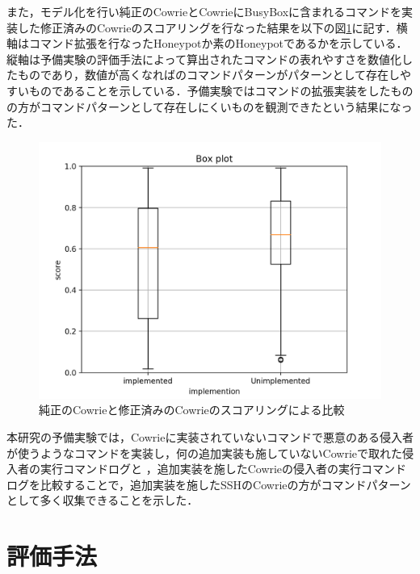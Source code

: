 
また，モデル化を行い純正のCowrieとCowrieにBusyBoxに含まれるコマンドを実装した修正済みのCowrieのスコアリングを行なった結果を以下の図\ref{fig:cowriecompare}に記す．横軸はコマンド拡張を行なったHoneypotか素のHoneypotであるかを示している．縦軸は予備実験の評価手法によって算出されたコマンドの表れやすさを数値化したものであり，数値が高くなればのコマンドパターンがパターンとして存在しやすいものであることを示している．予備実験ではコマンドの拡張実装をしたものの方がコマンドパターンとして存在しにくいものを観測できたという結果になった．

\begin{figure}[htbp]
    \centering
    \includegraphics[width=1.0\textwidth]{figures/Figure_1.png}
    \caption{純正のCowrieと修正済みのCowrieのスコアリングによる比較}
    \label{fig:cowriecompare}
\end{figure}

本研究の予備実験では，Cowrieに実装されていないコマンドで悪意のある侵入者が使うようなコマンドを実装し，何の追加実装も施していないCowrieで取れた侵入者の実行コマンドログと ，追加実装を施したCowrieの侵入者の実行コマンドログを比較することで，追加実装を施したSSHのCowrieの方がコマンドパターンとして多く収集できることを示した．


\section{評価手法}
\label{eval:eval}


